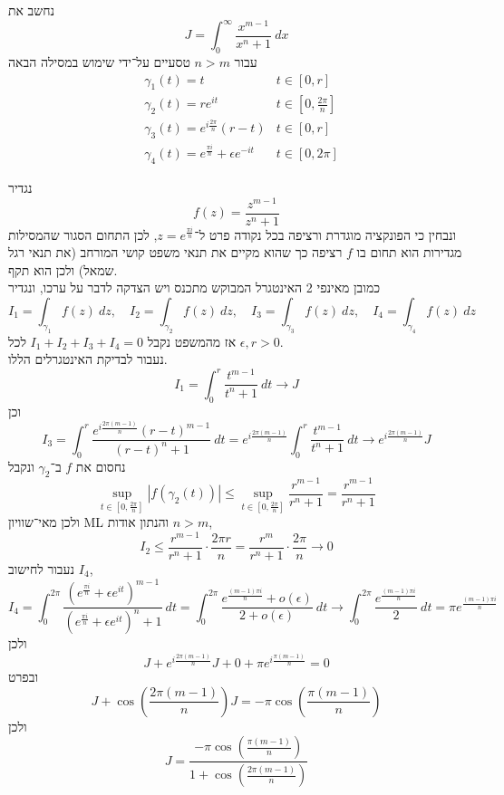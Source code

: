 \subquestion{}
נחשב את
\[
	J = \int_0^\infty \frac{x^{m - 1}}{x^n + 1}\ dx
\]
עבור $n > m$ טסעיים על־ידי שימוש במסילה הבאה
\begin{align*}
	& \gamma_1(t) = t & t \in [0, r] \\
	& \gamma_2(t) = r e^{it} & t \in [0, \frac{2\pi}{n}] \\
	& \gamma_3(t) = e^{i \frac{2\pi}{n}}(r - t) & t \in [0, r] \\
	& \gamma_4(t) = e^{\frac{\pi i}{n}} + \epsilon e^{-it} & t \in [0, 2\pi]
\end{align*}
\begin{solution}
	נגדיר
	\[
		f(z) = \frac{z^{m - 1}}{z^n + 1}
	\]
	ונבחין כי הפונקציה מוגדרת ורציפה בכל נקודה פרט ל־$z = e^{\frac{\pi i}{n}}$, לכן התחום הסגור שהמסילות מגדירות הוא תחום בו $f$ רציפה כך שהוא מקיים את תנאי משפט קושי המורחב (את תנאי רגל שמאל) ולכן הוא תקף. \\
	כמובן מאינפי 2 האינטגרל המבוקש מתכנס ויש הצדקה לדבר על ערכו, ונגדיר
	\[
		I_1 = \int_{\gamma_1} f(z)\ dz, \quad
		I_2 = \int_{\gamma_2} f(z)\ dz, \quad
		I_3 = \int_{\gamma_3} f(z)\ dz, \quad
		I_4 = \int_{\gamma_4} f(z)\ dz
	\]
	אז מהמשפט נקבל $I_1 + I_2 + I_3 + I_4 = 0$ לכל $\epsilon, r > 0$. \\
	נעבור לבדיקת האינטגרלים הללו.
	\[
		I_1
		= \int_0^r \frac{t^{m - 1}}{t^n + 1}\ dt
		\to J
	\]
	וכן
	\[
		I_3
		= \int_0^r \frac{e^{i \frac{2\pi (m - 1)}{n}} {(r - t)}^{m - 1}}{{(r - t)}^n + 1}\ dt
		= e^{i \frac{2\pi (m - 1)}{n}} \int_0^r \frac{t^{m - 1}}{t^n + 1}\ dt
		\to e^{i \frac{2\pi (m - 1)}{n}} J
	\]
	נחסום את $f$ ב־$\gamma_2$ ונקבל
	\[
		\sup_{t \in [0, \frac{2\pi}{n}]} |f(\gamma_2(t))|
		\le \sup_{t \in [0, \frac{2\pi}{n}]} \frac{r^{m - 1}}{r^n + 1}
		= \frac{r^{m - 1}}{r^n + 1}
	\]
	ולכן מאי־שוויון ML והנתון אודות $n > m$,
	\[
		I_2
		\le \frac{r^{m - 1}}{r^n + 1} \cdot \frac{2\pi r}{n}
		= \frac{r^m}{r^n + 1} \cdot \frac{2\pi}{n}
		\to 0
	\]
	נעבור לחישוב $I_4$,
	\[
		I_4
		= \int_{0}^{2\pi} \frac{{(e^{\frac{\pi i}{n}} + \epsilon e^{it})}^{m - 1}}{{(e^{\frac{\pi i}{n}} + \epsilon e^{it})}^n + 1}\ dt
		= \int_{0}^{2\pi} \frac{e^{\frac{(m - 1) \pi i}{n}} + o(\epsilon)}{2 + o(\epsilon)}\ dt
		\to \int_{0}^{2\pi} \frac{e^{\frac{(m - 1) \pi i}{n}}}{2}\ dt 
		= \pi e^{\frac{(m - 1) \pi i}{n}}
	\]
	ולכן
	\[
		J + e^{i \frac{2\pi(m - 1)}{n}} J + 0 + \pi e^{i \frac{\pi(m - 1)}{n}} = 0
	\]
	ובפרט
	\[
		J + \cos(\frac{2\pi(m - 1)}{n}) J = - \pi \cos(\frac{\pi(m - 1)}{n})
	\]
	ולכן
	\[
		J = \frac{- \pi \cos(\frac{\pi(m - 1)}{n})}{1 + \cos(\frac{2\pi(m - 1)}{n})}
	\]
\end{solution}

